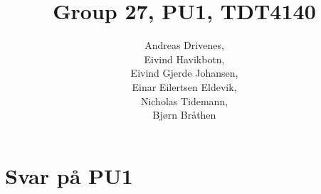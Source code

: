 \documentclass[english, a4paper]{article}
\title{Group 27, PU1, TDT4140}
\author{	Andreas Drivenes,\\
		Eivind Havikbotn,\\
		Eivind Gjerde Johansen,\\
		Einar Eilertsen Eldevik,\\
		Nicholas Tidemann,\\
		Bjørn Bråthen\\
}
\begin{document}

\maketitle

\section{Svar på PU1}


\newpage


\end{document}
